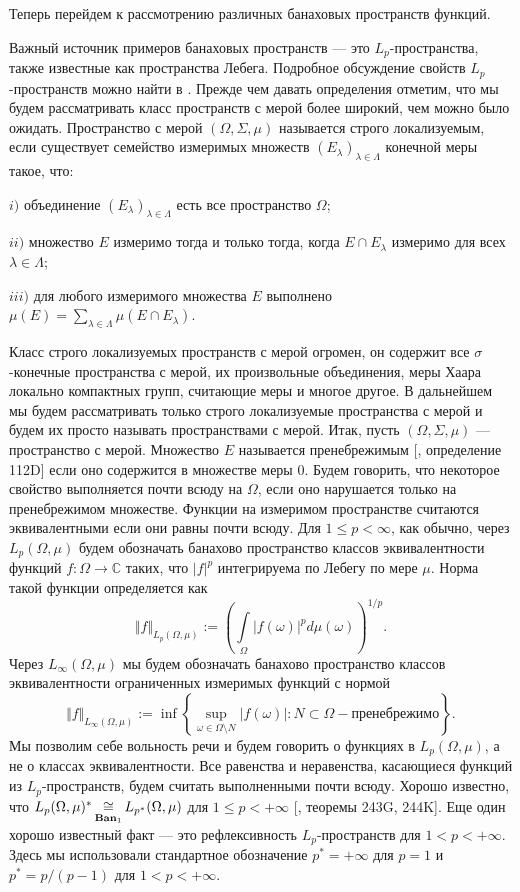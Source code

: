 Теперь перейдем к рассмотрению различных банаховых пространств функций.

Важный источник примеров банаховых пространств --- это $L_p$-пространства, также известные как пространства Лебега. Подробное обсуждение свойств $L_p$-пространств можно найти в  \cite{CarothShortCourseBanSp}. Прежде чем давать определения отметим, что мы будем рассматривать класс пространств с мерой более широкий, чем можно было ожидать. Пространство с мерой $(\Omega,\Sigma,\mu)$ называется строго локализуемым, если существует семейство измеримых множеств $(E_\lambda)_{\lambda\in\Lambda}$ конечной меры такое, что: 

$i)$ объединение $(E_\lambda)_{\lambda\in\Lambda}$ есть все пространство $\Omega$; 

$ii)$ множество $E$ измеримо тогда и только тогда, когда $E\cap E_\lambda$ измеримо для всех $\lambda\in\Lambda$; 

$iii)$ для любого измеримого множества $E$ выполнено $\mu(E)=\sum_{\lambda\in\Lambda}\mu(E\cap E_\lambda)$. 

\noindent
Класс строго локализуемых пространств с мерой огромен, он содержит все $\sigma$-конечные пространства с мерой, их произвольные объединения, меры Хаара локально компактных групп, считающие меры и многое другое. В дальнейшем мы будем рассматривать только строго локализуемые пространства с мерой и будем их просто называть пространствами с мерой. Итак, пусть $(\Omega,\Sigma,\mu)$ --- пространство с мерой. Множество $E$ называется пренебрежимым [\cite{FremMeasTh}, определение 112D] если оно содержится в множестве меры $0$. Будем говорить, что некоторое свойство выполняется почти всюду на $\Omega$, если оно нарушается только на пренебрежимом множестве. Функции на измеримом пространстве считаются эквивалентными если они равны почти всюду. Для $1\leq p <\infty$, как обычно, через $L_p(\Omega,\mu)$ будем обозначать банахово пространство классов эквивалентности функций $f:\Omega\to\mathbb{C}$ таких, что $|f|^p$ интегрируема по Лебегу по мере $\mu$. Норма такой функции определяется как 
$$
\Vert f\Vert_{L_p(\Omega,\mu)}:=\left(\int\limits_{\Omega}|f(\omega)|^pd\mu(\omega)\right)^{1/p}.
$$ 
Через $L_\infty(\Omega,\mu)$ мы будем обозначать банахово пространство классов эквивалентности ограниченных измеримых функций с нормой 
$$
\Vert f\Vert_{L_\infty(\Omega,\mu)}:=\inf\left\{\sup_{\omega\in\Omega\setminus N}|f(\omega)|:N\subset\Omega - \mbox{пренебрежимо}\right\}.
$$ 
Мы позволим себе вольность речи и будем говорить о функциях в $L_p(\Omega,\mu)$, а не о классах эквивалентности. Все равенства и неравенства, касающиеся функций из  $L_p$-пространств, будем считать выполненными почти всюду. Хорошо известно, что $L_p(\Omega,\mu)^*\mathop{\mathbin{\cong}}\limits_{\mathbf{Ban}_1}L_{p^*}(\Omega,\mu)$ для $1\leq p<+\infty$ [\cite{FremMeasTh}, теоремы 243G, 244K]. Еще один хорошо известный факт  --- это рефлексивность $L_p$-пространств для $1<p<+\infty$. Здесь мы использовали стандартное обозначение $p^*=+\infty$ для $p=1$ и $p^*=p/(p-1)$ для $1<p<+\infty$.

